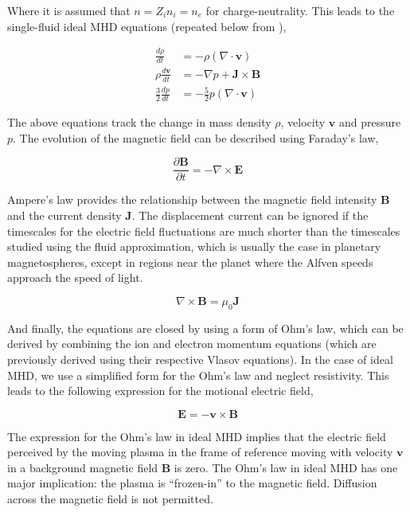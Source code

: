 Where it is assumed that $n = Z_i n_i = n_e$ for charge-neutrality. This leads to the single-fluid ideal MHD equations (repeated below from ),

\begin{align}
    \frac{d\rho}{dt} &= -\rho \left( \nabla \cdot \mathbf{v} \right)\\
    \rho \frac{d\mathbf{v}}{dt} & = -\nabla p + \mathbf{J} \times \mathbf{B} \\
    \frac{3}{2}\frac{d p}{d t}  & = - \frac{5}{2} p \left(\nabla \cdot \mathbf{v} \right)
\end{align}

The above equations track the change in mass density $\rho$, velocity $\mathbf{v}$ and pressure $p$. The evolution of the magnetic field can be described using Faraday's law,

\begin{equation}
    \frac{\partial \mathbf{B}}{\partial t} = - \nabla \times \mathbf{E}    
\end{equation}

Ampere's law provides the relationship between the magnetic field intensity $\mathbf{B}$ and the current density $\mathbf{J}$. The displacement current can be ignored if the timescales for the electric field fluctuations are much shorter than the timescales studied using the fluid approximation, which is usually the case in planetary magnetospheres, except in regions near the planet where the Alfven speeds approach the speed of light.

\begin{equation}
    \nabla \times \mathbf{B} = \mu_0 \mathbf{J}    
\end{equation}

And finally, the equations are closed by using a form of Ohm's law, which can be derived by combining the ion and electron momentum equations (which are previously derived using their respective Vlasov equations). In the case of ideal MHD, we use a simplified form for the Ohm's law and neglect resistivity. This leads to the following expression for the motional electric field, 

\begin{equation}
    \mathbf{E} = -\mathbf{v} \times \mathbf{B}
\end{equation}

The expression for the Ohm's law in ideal MHD implies that the electric field perceived by the moving plasma in the frame of reference moving with velocity $\mathbf{v}$ in a background magnetic field $\mathbf{B}$ is zero. The Ohm's law in ideal MHD has one major implication: the plasma is ``frozen-in'' to the magnetic field. Diffusion across the magnetic field is not permitted. 


